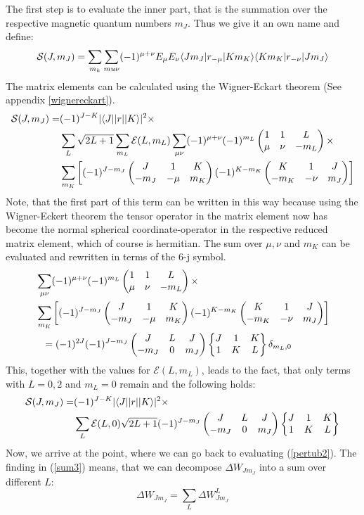 The first step is to evaluate the inner part, that is the summation over the respective magnetic quantum numbers $m_J$. Thus we give it an own name and define:
\begin{equation}
\mathcal{S}(J,m_J)=\sum_{m_k}\sum_{\\mu\nu}(-1)^{\mu+\nu}E_\mu E_\nu\langle Jm_J| r_{-\mu} | Km_K\rangle\langle Km_K| r_{-\nu} | Jm_J\rangle\label{sum}
\end{equation}
The matrix elements can be calculated using the Wigner-Eckart theorem (See appendix \ref{wignereckart}).
\begin{align}
\mathcal{S}(J,m_J)=&(-1)^{J-K}|\langle J| |r| | K\rangle|^2\times\notag\\&\sum_L\sqrt{2L+1}\sum_{m_L}\mathcal{E}(L,m_L)\sum_{\mu\nu}(-1)^{\mu+\nu}(-1)^{m_L}\begin{pmatrix}1&1&L\\\mu&\nu&-m_L\end{pmatrix}\times\notag\\&\sum_{m_K}\left[(-1)^{J-m_J}\begin{pmatrix}J&1&K\\-m_J&-\mu&m_K\end{pmatrix}(-1)^{K-m_K}\begin{pmatrix}K&1&J\\-m_K&-\nu&m_J\end{pmatrix}\right]\label{sum2}
\end{align}
Note, that the first part of this term can be written in this way because using the Wigner-Eckert theorem the tensor operator in the matrix element now has become the normal spherical coordinate-operator in the respective reduced matrix element, which of course is hermitian. The sum over $\mu,\nu$ and $m_K$ can be evaluated and rewritten in terms of the 6-j symbol.
\begin{align}
&\sum_{\mu\nu}(-1)^{\mu+\nu}(-1)^{m_L}\threej{1}{1}{L}{\mu}{\nu}{-m_L}\times\notag\\&\sum_{m_K}\left[(-1)^{J-m_J}\threej{J}{1}{K}{-m_J}{-\mu}{m_K}(-1)^{K-m_K}\threej{K}{1}{J}{-m_K}{-\nu}{m_J}\right]\notag\\&\ \ =(-1)^{2J}(-1)^{J-m_J}\threej{J}{L}{J}{-m_J}{0}{m_J}\sixj{J}{1}{K}{1}{K}{L}\delta_{m_L,0}
\end{align}
This, together with the values for $\mathcal{E}(L,m_L)$, leads to the fact, that only terms with $L=0,2$ and $m_L=0$ remain and the following holds:
\begin{align}
\mathcal{S}(J,m_J)=&(-1)^{J-K}|\langle J| |r| | K\rangle|^2\times\notag\\&\sum_{L}\mathcal{E}(L,0)\sqrt{2L+1} (-1)^{J-m_J}\begin{pmatrix}J&L&J\\-m_J&0&m_J\end{pmatrix}\begin{Bmatrix}J&1&K\\1&K&L\end{Bmatrix}\label{sum3}
\end{align}
Now, we arrive at the point, where we can go back to evaluating (\ref{pertub2}). The finding in (\ref{sum3}) means, that we can decompose $\Delta W_{Jm_J}$ into a sum over different $L$:
\begin{equation}
\Delta W_{Jm_J}=\sum_L\Delta W^L_{Jm_J}
\end{equation}
